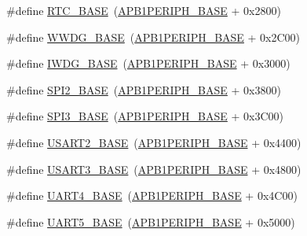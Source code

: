 \begin{DoxyCompactItemize}
\item 
\#define \mbox{\hyperlink{group___peripheral__memory__map_ga4265e665d56225412e57a61d87417022}{R\+T\+C\+\_\+\+B\+A\+SE}}~(\mbox{\hyperlink{group___peripheral__memory__map_ga45666d911f39addd4c8c0a0ac3388cfb}{A\+P\+B1\+P\+E\+R\+I\+P\+H\+\_\+\+B\+A\+SE}} + 0x2800)
\item 
\#define \mbox{\hyperlink{group___peripheral__memory__map_ga9a5bf4728ab93dea5b569f5b972cbe62}{W\+W\+D\+G\+\_\+\+B\+A\+SE}}~(\mbox{\hyperlink{group___peripheral__memory__map_ga45666d911f39addd4c8c0a0ac3388cfb}{A\+P\+B1\+P\+E\+R\+I\+P\+H\+\_\+\+B\+A\+SE}} + 0x2\+C00)
\item 
\#define \mbox{\hyperlink{group___peripheral__memory__map_ga8543ee4997296af5536b007cd4748f55}{I\+W\+D\+G\+\_\+\+B\+A\+SE}}~(\mbox{\hyperlink{group___peripheral__memory__map_ga45666d911f39addd4c8c0a0ac3388cfb}{A\+P\+B1\+P\+E\+R\+I\+P\+H\+\_\+\+B\+A\+SE}} + 0x3000)
\item 
\#define \mbox{\hyperlink{group___peripheral__memory__map_gac3e357b4c25106ed375fb1affab6bb86}{S\+P\+I2\+\_\+\+B\+A\+SE}}~(\mbox{\hyperlink{group___peripheral__memory__map_ga45666d911f39addd4c8c0a0ac3388cfb}{A\+P\+B1\+P\+E\+R\+I\+P\+H\+\_\+\+B\+A\+SE}} + 0x3800)
\item 
\#define \mbox{\hyperlink{group___peripheral__memory__map_gae634fe8faa6922690e90fbec2fc86162}{S\+P\+I3\+\_\+\+B\+A\+SE}}~(\mbox{\hyperlink{group___peripheral__memory__map_ga45666d911f39addd4c8c0a0ac3388cfb}{A\+P\+B1\+P\+E\+R\+I\+P\+H\+\_\+\+B\+A\+SE}} + 0x3\+C00)
\item 
\#define \mbox{\hyperlink{group___peripheral__memory__map_gade83162a04bca0b15b39018a8e8ec090}{U\+S\+A\+R\+T2\+\_\+\+B\+A\+SE}}~(\mbox{\hyperlink{group___peripheral__memory__map_ga45666d911f39addd4c8c0a0ac3388cfb}{A\+P\+B1\+P\+E\+R\+I\+P\+H\+\_\+\+B\+A\+SE}} + 0x4400)
\item 
\#define \mbox{\hyperlink{group___peripheral__memory__map_gabe0d6539ac0026d598274ee7f45b0251}{U\+S\+A\+R\+T3\+\_\+\+B\+A\+SE}}~(\mbox{\hyperlink{group___peripheral__memory__map_ga45666d911f39addd4c8c0a0ac3388cfb}{A\+P\+B1\+P\+E\+R\+I\+P\+H\+\_\+\+B\+A\+SE}} + 0x4800)
\item 
\#define \mbox{\hyperlink{group___peripheral__memory__map_ga94d92270bf587ccdc3a37a5bb5d20467}{U\+A\+R\+T4\+\_\+\+B\+A\+SE}}~(\mbox{\hyperlink{group___peripheral__memory__map_ga45666d911f39addd4c8c0a0ac3388cfb}{A\+P\+B1\+P\+E\+R\+I\+P\+H\+\_\+\+B\+A\+SE}} + 0x4\+C00)
\item 
\#define \mbox{\hyperlink{group___peripheral__memory__map_gaa155689c0e206e6994951dc3cf31052a}{U\+A\+R\+T5\+\_\+\+B\+A\+SE}}~(\mbox{\hyperlink{group___peripheral__memory__map_ga45666d911f39addd4c8c0a0ac3388cfb}{A\+P\+B1\+P\+E\+R\+I\+P\+H\+\_\+\+B\+A\+SE}} + 0x5000)

\end{DoxyCompactItemize}
